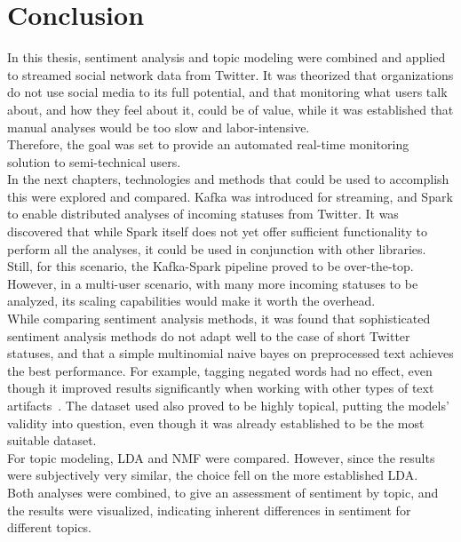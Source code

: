 \chapter{Conclusion}
\label{ch:conclusion}


In this thesis, sentiment analysis and topic modeling were combined and applied to streamed social network data from Twitter.
It was theorized that organizations do not use social media to its full potential,
and that monitoring what users talk about, and how they feel about it,
could be of value,
while it was established that manual analyses would be too slow and labor-intensive.
\\
Therefore, the goal was set to provide an automated real-time monitoring solution to semi-technical users.
\\
In the next chapters, technologies and methods that could be used to accomplish this were explored and compared.
Kafka was introduced for streaming, and Spark to enable distributed analyses of incoming statuses from Twitter.
It was discovered that while Spark itself does not yet offer sufficient functionality to perform all the analyses,
it could be used in conjunction with other libraries.
\\
Still, for this scenario, the Kafka-Spark pipeline proved to be over-the-top.
However, in a multi-user scenario, with many more incoming statuses to be analyzed,
its scaling capabilities would make it worth the overhead.
\\
While comparing sentiment analysis methods, it was found that sophisticated sentiment analysis methods do not adapt well
to the case of short Twitter statuses, and that a simple multinomial naive bayes on preprocessed text achieves the
best performance.
For example, tagging negated words had no effect, even though it improved results significantly when working with
other types of text artifacts~\cite{Hoffmann2005}.
The dataset used also proved to be highly topical, putting the models' validity into question,
even though it was already established to be the most suitable dataset.
\\
For topic modeling, LDA and NMF were compared.
However, since the results were subjectively very similar, the choice fell on the more established LDA.
\\
Both analyses were combined, to give an assessment of sentiment by topic, and the results were visualized,
indicating inherent differences in sentiment for different topics.
\\
